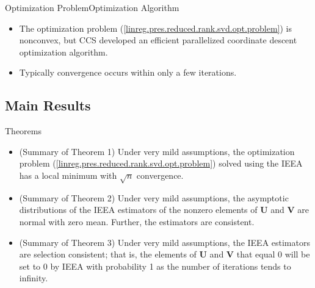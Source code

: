 \documentclass[notes]{beamer}       %
\begin{document}

\begin{frame}{Optimization Problem}{Optimization Algorithm}
  \begin{itemize}
   \item{ The optimization problem (\ref{linreg.pres.reduced.rank.svd.opt.problem}) is nonconvex, but CCS developed an efficient parallelized coordinate descent optimization algorithm.
   }
   \item{Typically convergence occurs within only a few iterations.
   }
  \end{itemize}
\end{frame}

\subsection{Main Results}

\begin{frame}{Theorems}
  \begin{itemize}
   \item{(Summary of Theorem 1) Under very mild assumptions, the optimization problem (\ref{linreg.pres.reduced.rank.svd.opt.problem}) solved using the IEEA has a local minimum with \(\sqrt{n}\) convergence.
   }
   \item{(Summary of Theorem 2) Under very mild assumptions, the asymptotic distributions of the IEEA estimators of the nonzero elements of \(\boldsymbol{U}\) and \(\boldsymbol{V}\) are normal with zero mean. Further, the estimators are consistent.
   }
   \item{(Summary of Theorem 3) Under very mild assumptions, the IEEA estimators are selection consistent; that is, the elements of \(\boldsymbol{U}\) and \(\boldsymbol{V}\) that equal 0 will be set to 0 by IEEA with probability 1 as the number of iterations tends to infinity.
   }
  \end{itemize}
\end{frame}
\end{document}
